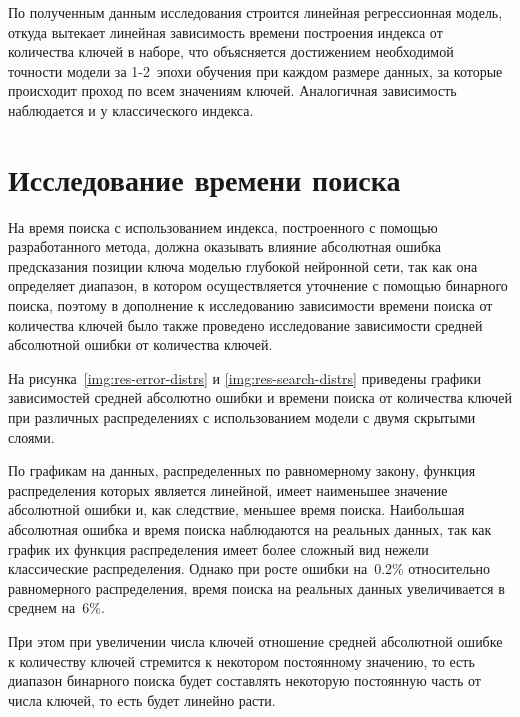 По полученным данным исследования строится линейная регрессионная модель, откуда
вытекает линейная зависимость времени построения индекса от количества ключей в
наборе, что объясняется достижением необходимой точности модели за
\mbox{1-2~эпохи} обучения при каждом размере данных, за которые происходит
проход по всем значениям ключей. Аналогичная зависимость наблюдается и у
классического индекса.



\section{Исследование времени поиска}

На время поиска с использованием индекса, построенного с помощью разработанного
метода, должна оказывать влияние абсолютная ошибка предсказания позиции ключа
моделью глубокой нейронной сети, так как она определяет диапазон, в котором
осуществляется уточнение с помощью бинарного поиска, поэтому в дополнение к
исследованию зависимости времени поиска от количества ключей было также
проведено исследование зависимости средней абсолютной ошибки от количества
ключей.

На рисунка~\ref{img:res-error-distrs} и \ref{img:res-search-distrs} приведены
графики зависимостей средней абсолютно ошибки и времени поиска от количества
ключей при различных распределениях с использованием модели с двумя скрытыми
слоями.



По графикам на данных, распределенных по равномерному закону, функция
распределения которых является линейной, имеет наименьшее значение абсолютной
ошибки и, как следствие, меньшее время поиска. Наибольшая абсолютная ошибка и
время поиска наблюдаются на реальных данных, так как график их функция
распределения имеет более сложный вид нежели классические распределения. Однако
при росте ошибки на~0.2\% относительно равномерного распределения, время поиска
на реальных данных увеличивается в среднем на~6\%.

При этом при увеличении числа ключей отношение средней абсолютной ошибке к
количеству ключей стремится к некотором постоянному значению, то есть диапазон
бинарного поиска будет составлять некоторую постоянную часть от числа ключей, то
есть будет линейно расти.

